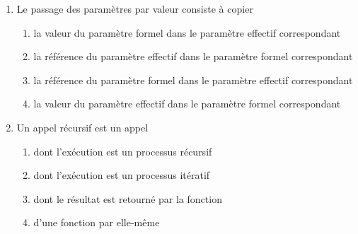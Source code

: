 \begin{td}[QCM (3)]
\begin{enumerate}
\item Le passage des paramètres par valeur consiste à copier
	\begin{enumerate}
	\item la valeur du paramètre formel dans le paramètre effectif correspondant
	\item la référence du paramètre effectif dans le paramètre formel correspondant
	\item la référence du paramètre formel dans le paramètre effectif correspondant
	\item la valeur du paramètre effectif dans le paramètre formel correspondant
	\end{enumerate}
	
\item Un appel récursif est un appel 
	\begin{enumerate}
	\item dont l'exécution est un processus récursif
	\item dont l'exécution est un processus itératif
	\item dont le résultat est retourné par la fonction
	\item d'une fonction par elle-même
	\end{enumerate}	
\end{enumerate}
\end{td}


